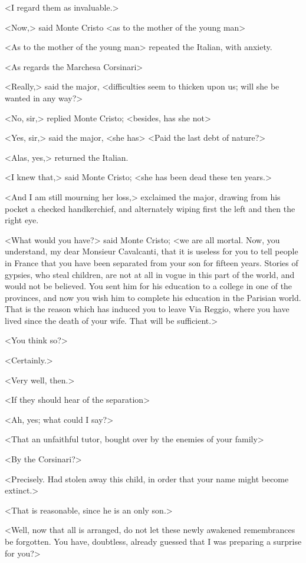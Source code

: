  <I regard them as invaluable.> 

 <Now,> said Monte Cristo <as to the mother of the young man\longdash> 

 <As to the mother of the young man\longdash> repeated the Italian, with anxiety. 

 <As regards the Marchesa Corsinari\longdash> 

 <Really,> said the major, <difficulties seem to thicken upon us; will she be wanted in any way?> 

 <No, sir,> replied Monte Cristo; <besides, has she not\longdash> 

 <Yes, sir,> said the major, <she has\longdash>  <Paid the last debt of nature?> 

 <Alas, yes,> returned the Italian. 

 <I knew that,> said Monte Cristo; <she has been dead these ten years.> 

 <And I am still mourning her loss,> exclaimed the major, drawing from his pocket a checked handkerchief, and alternately wiping first the left and then the right eye. 

 <What would you have?> said Monte Cristo; <we are all mortal. Now, you understand, my dear Monsieur Cavalcanti, that it is useless for you to tell people in France that you have been separated from your son for fifteen years. Stories of gypsies, who steal children, are not at all in vogue in this part of the world, and would not be believed. You sent him for his education to a college in one of the provinces, and now you wish him to complete his education in the Parisian world. That is the reason which has induced you to leave Via Reggio, where you have lived since the death of your wife. That will be sufficient.> 

 <You think so?> 

 <Certainly.> 

 <Very well, then.> 

 <If they should hear of the separation\longdash> 

 <Ah, yes; what could I say?> 

 <That an unfaithful tutor, bought over by the enemies of your family\longdash> 

 <By the Corsinari?> 

 <Precisely. Had stolen away this child, in order that your name might become extinct.> 

 <That is reasonable, since he is an only son.> 

 <Well, now that all is arranged, do not let these newly awakened remembrances be forgotten. You have, doubtless, already guessed that I was preparing a surprise for you?> 

